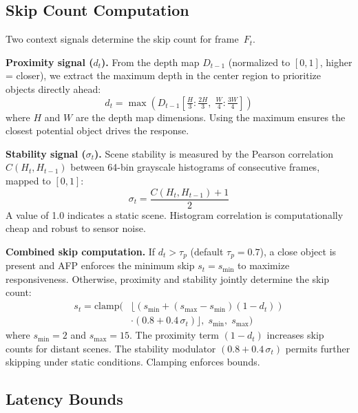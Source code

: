 \documentclass[conference]{IEEEtran}
\begin{document}
\subsection{Skip Count Computation}

Two context signals determine the skip count for frame~$F_t$.

\textbf{Proximity signal ($d_t$).} From the depth map $D_{t-1}$
(normalized to $[0,1]$, higher = closer), we extract the maximum
depth in the center region to prioritize objects directly ahead:
\begin{equation}
  d_t = \max\!\left(D_{t-1}\!\left[\tfrac{H}{3}:\tfrac{2H}{3},\;
    \tfrac{W}{4}:\tfrac{3W}{4}\right]\right)
  \label{eq:proximity}
\end{equation}
where $H$ and $W$ are the depth map dimensions. Using the maximum
ensures the closest potential object drives the response.

\textbf{Stability signal ($\sigma_t$).} Scene stability is measured
by the Pearson correlation $C(H_t, H_{t-1})$ between 64-bin
grayscale histograms of consecutive frames, mapped to $[0,1]$:
\begin{equation}
  \sigma_t = \frac{C(H_t, H_{t-1}) + 1}{2}
  \label{eq:stability}
\end{equation}
A value of 1.0 indicates a static scene. Histogram correlation is
computationally cheap and robust to sensor noise.

\textbf{Combined skip computation.} If $d_t > \tau_p$ (default
$\tau_p = 0.7$), a close object is present and AFP enforces the
minimum skip $s_t = s_\text{min}$ to maximize responsiveness.
Otherwise, proximity and stability jointly determine the skip
count:
\begin{equation}
  \begin{split}
    s_t = \text{clamp}\Big(
      &\lfloor (s_\text{min} + (s_\text{max} - s_\text{min})
        (1 - d_t)) \\
      &\cdot (0.8 + 0.4\,\sigma_t) \rfloor,\;
      s_\text{min},\; s_\text{max} \Big)
  \end{split}
  \label{eq:skip}
\end{equation}
where $s_\text{min} = 2$ and $s_\text{max} = 15$. The proximity
term $(1 - d_t)$ increases skip counts for distant scenes. The
stability modulator $(0.8 + 0.4\,\sigma_t)$ permits further
skipping under static conditions. Clamping enforces bounds.

\subsection{Latency Bounds}
\label{sec:latency}
\end{document}

